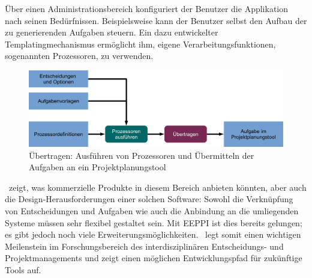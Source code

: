 	Über einen Administrationsbereich konfiguriert der Benutzer die Applikation nach seinen Bedürfnissen. 
	Beispielsweise kann der Benutzer selbst den Aufbau der zu generierenden Aufgaben steuern. 
	Ein dazu entwickelter Templatingmechanismus ermöglicht ihm, eigene Verarbeitungsfunktionen, sogenannten Prozessoren, zu verwenden. 
	
	\begin{figure}[H]
		\includegraphics[width=\textwidth]{introduction/img/simpleProcessWorkflow.jpg}
		\centering
		\caption{Übertragen: Ausführen von Prozessoren und Übermitteln der Aufgaben an ein Projektplanungstool}
		\label{fig:metamapping}
	\end{figure}
	
	\eeppi\ zeigt, was kommerzielle Produkte in diesem Bereich anbieten könnten, 
	aber auch die Design-Herausforderungen einer solchen Software: 
	Sowohl die Verknüpfung von Entscheidungen und Aufgaben wie auch die Anbindung an die umliegenden Systeme müssen sehr flexibel gestaltet sein.
	Mit EEPPI ist dies bereits gelungen; es gibt jedoch noch viele Erweiterungsmöglichkeiten. 
	\eeppi\ legt somit einen wichtigen Meilenstein im Forschungsbereich des interdisziplinären Entscheidungs- und Projektmanagements 
	und zeigt einen möglichen Entwicklungspfad für zukünftige Tools auf.
	
	\captionsetup[figure]{labelformat=default} %